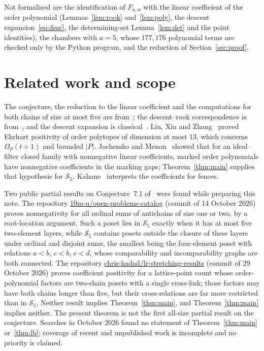 \documentclass[11pt]{article}
\theoremstyle{definition}
\theoremstyle{remark}
\begin{document}
Not formalized are the identification of $F_{a,w}$ with the linear
coefficient of the order polynomial (Lemmas~\ref{lem:rook}
and~\ref{lem:poly}, the descent expansion~\eqref{eq:desc}, the
determining-set Lemma~\ref{lem:det} and the point identities), the
chambers with $a=5$, whose $177{,}176$ polynomial terms are checked only
by the Python program, and the reduction of Section~\ref{sec:proof}.

\section{Related work and scope}\label{sec:related}

The conjecture, the reduction to the linear coefficient and the
computations for both chains of size at most five are
from~\cite{FMP}; the descent--rook correspondence is
from~\cite{AJ}, and the descent expansion is classical~\cite{Stanley}.
Liu, Xin and Zhang~\cite{LXZ} proved Ehrhart positivity of order
polytopes of dimension at most $13$, which concerns $\Omega_P(t+1)$ and
bounded $|P|$. Jochemko and Menon~\cite{JM} showed that for an
ideal--filter closed family with nonnegative linear coefficients, marked
order polynomials have nonnegative coefficients in the marking gaps;
Theorem~\ref{thm:main} supplies that hypothesis for $\mathcal S_5$.
Kahane~\cite{Kahane} interprets the coefficients for fences.

Two public partial results on Conjecture~7.1 of~\cite{FMP} were found
while preparing this note. The repository
\href{https://github.com/10m-u/open-problems-catalog/tree/ca8d4d44ba3db527f19f28928c240168f545ecfe}{10m-u/open-problems-catalog}
(commit of 14 October 2026) proves nonnegativity for all ordinal sums of
antichains of size one or two, by a root-location argument. Such a poset
lies in $\mathcal S_5$ exactly when it has at most five two-element
layers, while $\mathcal S_5$ contains posets outside the closure of
these layers under ordinal and disjoint sums, the smallest being the
four-element poset with relations $a<b$, $c<b$, $c<d$, whose
comparability and incomparability graphs are both connected. The
repository
\href{https://github.com/chris-hadad/lr-stretching-results/blob/0677a8b4bda0db770ad690824c236222783eeb95/results/overlap-families/proofs/A58-COUPLED-PROOF.md}{chris-hadad/lr-stretching-results}
(commit of 29 October 2026) proves coefficient positivity for a
lattice-point count whose order-polynomial factors are two-chain posets
with a single cross-link; those factors may have both chains longer than
five, but their cross-relations are far more restricted than in
$\mathcal S_5$. Neither result implies Theorem~\ref{thm:main}, and
Theorem~\ref{thm:main} implies neither. The present theorem is not the
first all-size partial result on the conjecture. Searches in October
2026 found no statement of Theorem~\ref{thm:main} or~\ref{thm:lb};
coverage of recent and unpublished work is incomplete and no priority
is claimed.
\end{document}
